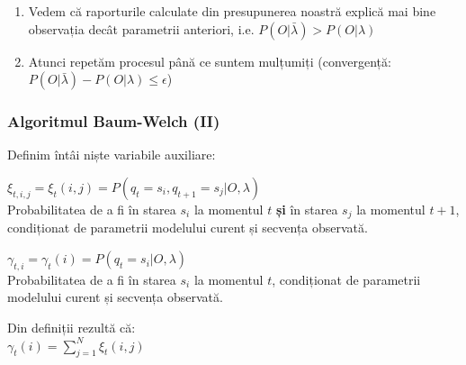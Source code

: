 \begin{frame}[fragile, t]
{\begin{enumerate}
		\item Vedem că raporturile calculate din presupunerea noastră explică mai bine observația decât parametrii
				anteriori, i.e. $P(O \vert \bar{\lambda}) > P(O \vert \lambda) $%
		\vspace*{0.5em}
		\pause
		\item Atunci repetăm procesul până ce suntem mulțumiți (convergență: 
				$P(O \vert \bar{\lambda}) - P(O \vert \lambda) \le \epsilon$)
	\end{enumerate}
	}
\end{frame}

\begin{frame}[t]
	\frametitle{Algoritmul Baum-Welch (II)}
	\pause
	Definim întâi niște variabile auxiliare:
	
	\begin{block}{}    
    	$\xi_{t,i,j} = \xi_t(i,j) = P(q_t=s_i,q_{t+1}=s_j \vert O, \lambda)$\\
    	Probabilitatea de a fi în starea $s_i$ la momentul $t$ \textbf{și} în starea $s_j$ la momentul $t+1$,
    	condiționat de parametrii modelului curent și secvența observată.
	\end{block}
	\pause
	
	\begin{block}{}    
    	$ \gamma_{t,i} = \gamma_t(i) = P(q_t = s_i \vert O, \lambda)$\\
    	Probabilitatea de a fi în starea $s_i$ la momentul $t$, condiționat de parametrii modelului curent și 
    	secvența observată.
	\end{block}
	\vspace*{1em}
	\pause
	
	Din definiții rezultă că:\\
	$ \gamma_t(i) = \displaystyle\sum_{j=1}^{N}\xi_t(i,j)$
  	
\end{frame}

